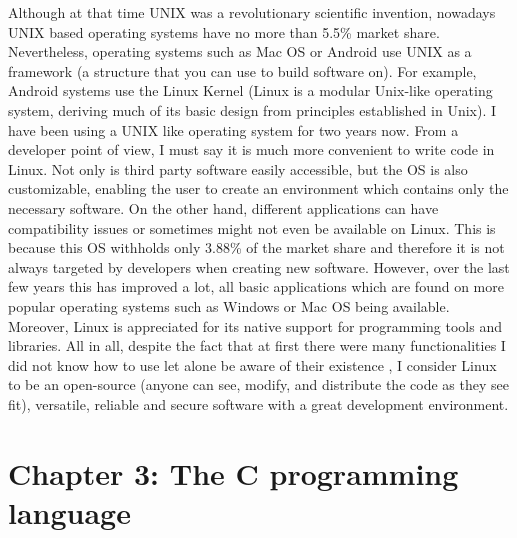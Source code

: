 \documentclass[12pt]{article}
\begin{document}
Although at that time UNIX was a revolutionary scientific invention, nowadays UNIX based operating systems have no more than 5.5\% market share. Nevertheless, operating systems such as Mac OS or Android use UNIX as a framework (a structure that you can use to build software on). For example, Android systems use the Linux Kernel (Linux is a modular Unix-like operating system, deriving much of its basic design from principles established in Unix). I have been using a UNIX like operating system for two years now. From a developer point of view, I must say it is much more convenient to write code in Linux. Not only is third party software easily accessible, but the OS is also customizable, enabling the user to create an environment which contains only the necessary software. On the other hand, different applications can have compatibility issues or sometimes might not even be available on Linux. This is because this OS withholds only 3.88\% of the market share and therefore it is not always targeted by developers when creating new software. However, over the last few years this has improved a lot, all basic applications which are found on more popular operating systems such as Windows or Mac OS being available. Moreover, Linux 
is appreciated for its native support for programming tools and libraries. All in all, despite the fact that at first there were many functionalities I did not know how to use let alone be aware of their existence , I consider Linux to be an open-source (anyone can see, modify, and distribute the code as they see fit), versatile, reliable and secure software with a great development environment.

\newpage

\section{Chapter 3: The C programming language}
\end{document}
